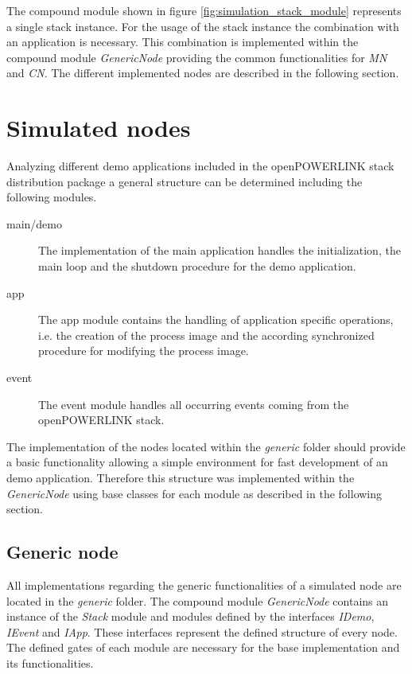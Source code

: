 The compound module shown in figure  \ref{fig:simulation_stack_module} represents a single stack instance.
For the usage of the stack instance the combination with an application is necessary.
This combination is implemented within the compound module \emph{GenericNode} providing the common functionalities for \emph{MN} and \emph{CN}.
The different implemented nodes are described in the following section.

\section{Simulated nodes}
\label{sec:porting_nodes}
Analyzing different demo applications included in the openPOWERLINK stack distribution package a general structure can be determined including the following modules.

\begin{description}
    \item[main/demo] The implementation of the main application handles the initialization, the main loop and the shutdown procedure for the demo application.
    \item[app] The app module contains the handling of application specific operations, i.e. the creation of the process image and the according synchronized procedure for modifying the process image.
    \item[event] The event module handles all occurring events coming from the openPOWERLINK stack.
\end{description}

The implementation of the nodes located within the \emph{generic} folder should provide a basic functionality allowing a simple environment for fast development of an demo application.
Therefore this structure was implemented within the \emph{GenericNode} using base classes for each module as described in the following section.

\subsection{Generic node}
\label{sec:porting_nodes_generic}
All implementations regarding the generic functionalities of a simulated node are located in the \emph{generic} folder.
The compound module \emph{GenericNode} contains an instance of the \emph{Stack} module and modules defined by the interfaces \emph{IDemo}, \emph{IEvent} and \emph{IApp}.
These interfaces represent the defined structure of every node.
The defined gates of each module are necessary for the base implementation and its functionalities.

